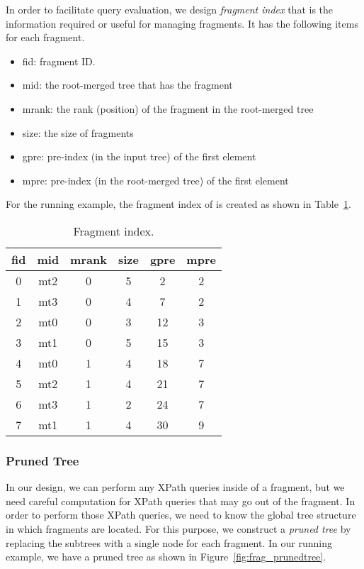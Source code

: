 In order to facilitate query evaluation, we design \emph{fragment index} that
is the information required or useful for managing fragments. It has the
following items for each fragment.

\begin{itemize}
	\item fid: fragment ID.
	\item mid: the root-merged tree that has the fragment
	\item mrank: the rank (position) of the fragment in the root-merged tree
	\item size: the size of fragments
	\item gpre: pre-index (in the input tree) of the first element
	\item mpre: pre-index (in the root-merged tree) of the first element
\end{itemize}

For the running example, the fragment index of is created as shown in
Table~\ref{tab:fragmentindex}. 

\begin{table}[t]
	\centering 
	\begin{tabular}{c|c|c|c|c|c}
		\hline
		fid & mid & mrank & size & gpre & mpre \\
		\hline
		0   & mt2 & 0     &   5  & 2    & 2    \\
		1   & mt3 & 0     &   4  & 7    & 2    \\
		2   & mt0 & 0     &   3  & 12   & 3    \\
		3   & mt1 & 0     &   5  & 15   & 3    \\
		4   & mt0 & 1     &   4  & 18   & 7    \\
		5   & mt2 & 1     &   4  & 21   & 7    \\
		6   & mt3 & 1     &   2  & 24   & 7    \\
		7   & mt1 & 1     &   4  & 30   & 9    \\
		\hline
	\end{tabular} 
	\caption{Fragment index.}
	\label{tab:fragmentindex}	
\end{table}

\subsubsection{Pruned Tree}

In our design, we can perform any XPath queries inside of a fragment,  but we
need careful computation for XPath queries that may go out of the  fragment. In
order to perform those XPath queries, we need to know the  global tree structure
in which fragments are located. For this purpose, we construct a \emph{pruned
tree} by replacing the  subtrees with a single node for each fragment. In our
running example, we have a pruned tree as shown in
Figure~\ref{fig:frag_prunedtree}. 


